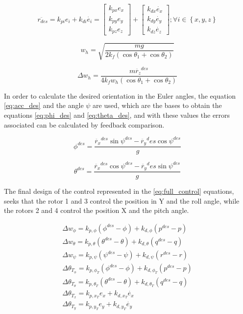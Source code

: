\documentclass[a4paper, 12pt, oneside]{book}
\begin{document}
\begin{equation}
\ddot{r_{des}}=k_{pi}e_i+k_{di}\dot{e_i}=
\begin{bmatrix}
k_{px}e_x\\ 
k_{py}e_y\\ 
k_{pz}e_z
\end{bmatrix}
+
\begin{bmatrix}
k_{dx}\dot{e_x}\\ 
k_{dy}\dot{e_y}\\ 
k_{dz}\dot{e_z}
\end{bmatrix}
;
\forall i \in \left \{ x, y, z \right \}
\label{eq:acc_des}
\end{equation}

\begin{equation}
w_h=\sqrt{\frac{mg}{2k_f(\cos\theta_1+\cos\theta_2)}}
\label{eq:w}
\end{equation}

\begin{equation}
\Delta w_h=\frac{m\ddot{r_z}^{des}}{4k_fw_h(\cos\theta_1+\cos\theta_2)}
\label{eq:dw}
\end{equation}

In order to calculate the desired orientation in the Euler angles, the equation \ref{eq:acc_des} and the angle $\psi$ are used, which are the bases to obtain the equations \ref{eq:phi_des} and \ref{eq:theta_des}, and with these values the errors associated can be calculated by feedback comparison.

\begin{equation}
\phi^{des}=\frac{\ddot{r_x}^{des}\sin\psi^{des}-\ddot{r_y}^des\cos\psi^{des}}{g}
\label{eq:phi_des}
\end{equation}

\begin{equation}
\theta^{des}=\frac{\ddot{r_x}^{des}\cos\psi^{des}-\ddot{r_y}^des\sin\psi^{des}}{g}
\label{eq:theta_des}
\end{equation}

The final design of the control represented in the \ref{eq:full_control} equations, seeks that the rotor 1 and 3 control the position in Y and the roll angle, while the rotors 2 and 4 control the position X and the pitch angle.

\begin{equation}
\begin{split}
\Delta w_\phi=k_{p,\phi}(\phi^{des}-\phi)+k_{d,\phi}(p^{des}-p)\\
\Delta w_\theta=k_{p,\theta}(\theta^{des}-\theta)+k_{d,\theta}(q^{des}-q)\\
\Delta w_\psi=k_{p,\psi}(\psi^{des}-\psi)+k_{d,\psi}(r^{des}-r)\\
\Delta \theta_{T_\phi}=k_{p,\phi_T}(\phi^{des}-\phi)+k_{d,\phi_T}(p^{des}-p)\\
\Delta \theta_{T_\theta}=k_{p,\theta_T}(\theta^{des}-\theta)+k_{d,\theta_T}(q^{des}-q)\\
\Delta \theta_{T_x}=k_{p,x_T}e_x+k_{d,x_T}\dot{e_x}\\
\Delta \theta_{T_y}=k_{p,y_T}e_y+k_{d,y_T}\dot{e_y}
\end{split}
\label{eq:full_control}
\end{equation}
\end{document}
